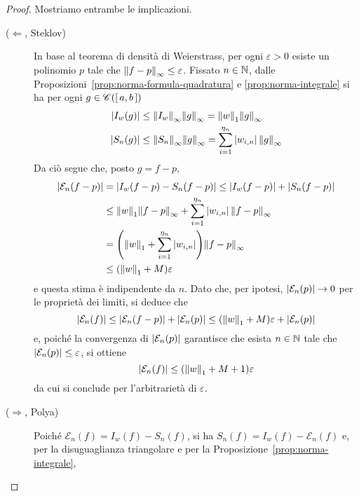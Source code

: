 	\begin{proof}
		Mostriamo entrambe le implicazioni.
		
		\begin{description}
			\item[(\(\Leftarrow\), Steklov)] In base al teorema di densità di Weierstrass, per ogni \(\varepsilon > 0\) esiste un polinomio \(p\) tale che \(\norm{f - p}_\infty \le \varepsilon\). Fissato \(n \in \mathbb{N}\), dalle Proposizioni~\ref{prop:norma-formula-quadratura} e \ref{prop:norma-integrale} si ha per ogni \(g \in \mathscr{C} ([\, a, b \,])\)
			\begin{align*}
				\abs{I_w (g)} & \le \norm{I_w}_\infty \norm{g}_\infty = \norm{w}_1 \norm{g}_\infty \\
				\abs{S_n (g)} & \le \norm{S_n}_\infty \norm{g}_\infty = \sum_{i = 1}^{\eta_n} \abs{w_{i, n}} \, \norm{g}_\infty
			\end{align*}
			Da ciò segue che, posto \(g = f - p\),
			\begin{equation*}
				\begin{split}
					\abs{\mathcal{E}_n (f - p)} &= \abs{I_w (f - p) - S_n (f - p)} \le \abs{I_w (f - p)} + \abs{S_n (f - p)} \\
					& \le \norm{w}_1 \norm{f - p}_\infty + \sum_{i = 1}^{\eta_n} \abs{w_{i, n}} \, \norm{f - p}_\infty \\
					&= \qty(\norm{w}_1 + \sum_{i = 1}^{\eta_n} \abs{w_{i, n}}) \norm{f - p}_\infty \\
					& \le \qty(\norm{w}_1 + M) \varepsilon
				\end{split}
			\end{equation*}
			e questa stima è indipendente da \(n\). Dato che, per ipotesi, \(\abs{\mathcal{E}_n (p)} \to 0\) per le proprietà dei limiti, si deduce che
			\begin{equation*}
				\abs{\mathcal{E}_n (f)} \le \abs{\mathcal{E}_n (f - p)} + \abs{\mathcal{E}_n (p)} \le \qty(\norm{w}_1 + M) \varepsilon + \abs{\mathcal{E}_n (p)}
			\end{equation*}
			e, poiché la convergenza di \(\abs{\mathcal{E}_n (p)}\) garantisce che esista \(n \in \mathbb{N}\) tale che \(\abs{\mathcal{E}_n (p)} \le \varepsilon\), si ottiene
			\begin{equation*}
				\abs{\mathcal{E}_n (f)} \le \qty(\norm{w}_1 + M + 1) \varepsilon
			\end{equation*}
			da cui si conclude per l'arbitrarietà di \(\varepsilon\).
			\item[(\(\Rightarrow\), Polya)] Poiché \(\mathcal{E}_n (f) = I_w (f) - S_n (f)\), si ha \(S_n (f) = I_w (f) - \mathcal{E}_n (f)\) e, per la disuguaglianza triangolare e per la Proposizione~\ref{prop:norma-integrale},

\end{description}
\end{proof}
